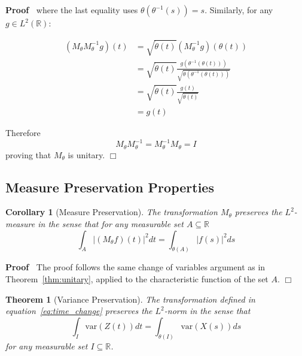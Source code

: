 \documentclass{article}
\newenvironment{proof}{\noindent\textbf{Proof\ }}{\hspace*{\fill}$\Box$\medskip}
\newtheorem{corollary}{Corollary}
\newtheorem{theorem}{Theorem}
\begin{document}
\begin{proof}
  where the last equality uses $\theta (\theta^{- 1} (s)) = s$. Similarly, for
  any $g \in L^2 (\mathbb{R})$:
  
  \begin{align}
    (M_{\theta} M_{\theta}^{- 1} g) (t) & = \sqrt{\dot{\theta} (t)} 
    (M_{\theta}^{- 1} g) (\theta (t)) \\
    & = \sqrt{\dot{\theta} (t)}  \frac{g (\theta^{- 1} (\theta
    (t)))}{\sqrt{\dot{\theta} (\theta^{- 1} (\theta (t)))}} \\
    & = \sqrt{\dot{\theta} (t)}  \frac{g (t)}{\sqrt{\dot{\theta} (t)}} \\
    & = g (t) 
  \end{align}
  
  Therefore
  \begin{equation}
    M_{\theta} M_{\theta}^{- 1} = M_{\theta}^{- 1} M_{\theta} = I
  \end{equation}
  proving that $M_{\theta}$ is unitary.
\end{proof}

\subsection{Measure Preservation Properties}

\begin{corollary}
  [Measure Preservation]\label{cor:measure_preserve} The transformation
  $M_{\theta}$ preserves the $L^2$-measure in the sense that for any
  measurable set $A \subseteq \mathbb{R}$
  \begin{equation}
    \label{eq:measure_preserve_sets} \int_A | (M_{\theta} f) (t) |^2 dt =
    \int_{\theta (A)} |f (s) |^2 ds
  \end{equation}
\end{corollary}

\begin{proof}
  The proof follows the same change of variables argument as in
  Theorem~\ref{thm:unitary}, applied to the characteristic function of the set
  $A$.
\end{proof}

\begin{theorem}
  [Variance Preservation]\label{thm:measure_preserve} The transformation
  defined in equation~\eqref{eq:time_change} preserves the $L^2$-norm in the
  sense that
  \begin{equation}
    \label{eq:measure_preserve} \int_I \mathrm{var} (Z (t)) dt = \int_{\theta
    (I)} \mathrm{var} (X (s)) ds
  \end{equation}
  for any measurable set $I \subseteq \mathbb{R}$.
\end{theorem}
\end{document}
